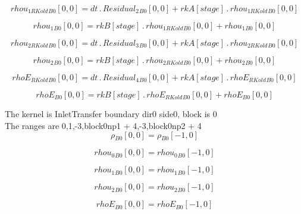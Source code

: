 \documentclass{article}
\begin{document}
\begin{dmath}{rhou_{1 RKold}{_{B0}}}[{0,0}] = dt \,.\, {Residual_{2}{_{B0}}}[{0,0}] + {rkA}[{stage}] \,.\, {rhou_{1 RKold}{_{B0}}}[{0,0}]\end{dmath}

\begin{dmath}{rhou_{1}{_{B0}}}[{0,0}] = {rkB}[{stage}] \,.\, {rhou_{1 RKold}{_{B0}}}[{0,0}] + {rhou_{1}{_{B0}}}[{0,0}]\end{dmath}

\begin{dmath}{rhou_{2 RKold}{_{B0}}}[{0,0}] = dt \,.\, {Residual_{3}{_{B0}}}[{0,0}] + {rkA}[{stage}] \,.\, {rhou_{2 RKold}{_{B0}}}[{0,0}]\end{dmath}

\begin{dmath}{rhou_{2}{_{B0}}}[{0,0}] = {rkB}[{stage}] \,.\, {rhou_{2 RKold}{_{B0}}}[{0,0}] + {rhou_{2}{_{B0}}}[{0,0}]\end{dmath}

\begin{dmath}{rhoE_{RKold}{_{B0}}}[{0,0}] = dt \,.\, {Residual_{4}{_{B0}}}[{0,0}] + {rkA}[{stage}] \,.\, {rhoE_{RKold}{_{B0}}}[{0,0}]\end{dmath}

\begin{dmath}{rhoE{_{B0}}}[{0,0}] = {rkB}[{stage}] \,.\, {rhoE_{RKold}{_{B0}}}[{0,0}] + {rhoE{_{B0}}}[{0,0}]\end{dmath}

\noindent The kernel is InletTransfer boundary dir0 side0, block is 0\\\noindent The ranges are 0,1,-3,block0np1 + 4,-3,block0np2 + 4\\\begin{dmath}{\rho{_{B0}}}[{0,0}] = {\rho{_{B0}}}[{-1,0}]\end{dmath}

\begin{dmath}{rhou_{0}{_{B0}}}[{0,0}] = {rhou_{0}{_{B0}}}[{-1,0}]\end{dmath}

\begin{dmath}{rhou_{1}{_{B0}}}[{0,0}] = {rhou_{1}{_{B0}}}[{-1,0}]\end{dmath}

\begin{dmath}{rhou_{2}{_{B0}}}[{0,0}] = {rhou_{2}{_{B0}}}[{-1,0}]\end{dmath}

\begin{dmath}{rhoE{_{B0}}}[{0,0}] = {rhoE{_{B0}}}[{-1,0}]\end{dmath}
\end{document}
